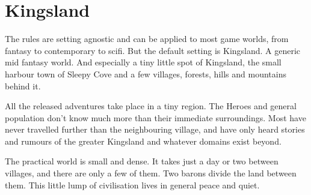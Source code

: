 \clearpage %

\section*{Kingsland}

The rules are setting agnostic and can be applied to most game worlds, from fantasy to contemporary to scifi. But the default setting is Kingsland. A generic mid fantasy world. And especially a tiny little spot of Kingsland, the small harbour town of Sleepy Cove and a few villages, forests, hills and mountains behind it.

All the released adventures take place in a tiny region. The Heroes and general population don't know much more than their immediate surroundings. Most have never travelled further than the neighbouring village, and have only heard stories and rumours of the greater Kingsland and whatever domains exist beyond.

The practical world is small and dense. It takes just a day or two between villages, and there are only a few of them. Two barons divide the land between them. This little lump of civilisation lives in general peace and quiet.










